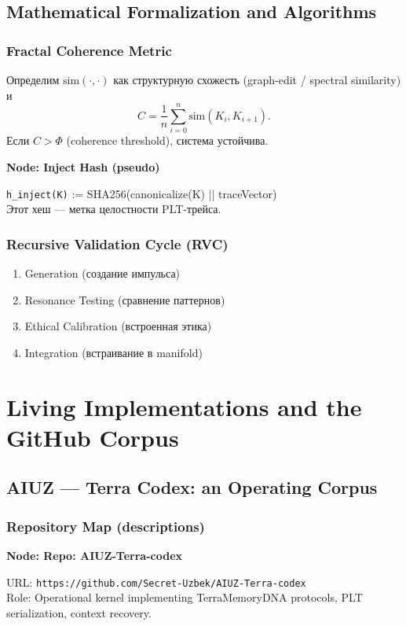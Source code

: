 \documentclass[11pt,oneside]{book}
\newenvironment{nodebox}[1]{%
  \vspace{6pt}
  \begin{framed}\noindent\textbf{Node: #1}\par\medskip\small\begingroup\setlength{\parindent}{0pt}\begin{minipage}{0.94\textwidth}\raggedright
}{%
  \end{minipage}\endgroup\end{framed}\vspace{6pt}
}
\begin{document}
\chapter{Mathematical Formalization and Algorithms}
\section{Fractal Coherence Metric}
Определим $\text{sim}(\cdot,\cdot)$ как структурную схожесть (graph-edit / spectral similarity) и
\[
C = \frac{1}{n}\sum_{i=0}^{n}\text{sim}(K_i,K_{i+1}).
\]
Если $C>\Phi$ (coherence threshold), система устойчива.

\begin{nodebox}{Inject Hash (pseudo)}
\texttt{h\_inject(K)} := SHA256(canonicalize(K) || traceVector)\\
Этот хеш — метка целостности PLT-трейса.
\end{nodebox}

\section{Recursive Validation Cycle (RVC)}
\begin{enumerate}
  \item Generation (создание импульса)
  \item Resonance Testing (сравнение паттернов)
  \item Ethical Calibration (встроенная этика)
  \item Integration (встраивание в manifold)
\end{enumerate}

\part{Living Implementations and the GitHub Corpus}
\chapter{AIUZ — Terra Codex: an Operating Corpus}
\section{Repository Map (descriptions)}
\begin{nodebox}{Repo: AIUZ-Terra-codex}
URL: \texttt{https://github.com/Secret-Uzbek/AIUZ-Terra-codex}\\
Role: Operational kernel implementing TerraMemoryDNA protocols, PLT serialization, context recovery.
\end{nodebox}
\end{document}
